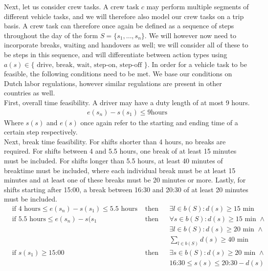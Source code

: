 \documentclass[]{article}
\begin{document}
Next, let us consider crew tasks. A crew task $c$ may perform multiple segments of different vehicle tasks, and we will therefore also model our crew tasks on a trip basis. A crew task can therefore once again be defined as a sequence of steps throughout the day of the form $S = \{ s_1, \dots, s_n \}$. We will however now need to incorporate breaks, waiting and handovers as well; we will consider all of these to be steps in this sequence, and will differentiate between action types using $a(s) \in \{\text{ drive, break, wait, step-on, step-off }\}$. In order for a vehicle task to be feasible, the following conditions need to be met. We base our conditions on Dutch labor regulations, however similar regulations are present in other countries as well. \\ 
First, overall time feasibility. A driver may have a duty length of at most 9 hours. \\
\begin{align}
  e(s_n) - s(s_1) \leq 9\text{hours}
\end{align}
Where $s(s)$ and $e(s)$ once again refer to the starting and ending time of a certain step respectively. \\
Next, break time feasibility. For shifts shorter than 4 hours, no breaks are required. For shifts between 4 and 5.5 hours, one break of at least 15 minutes must be included. For shifts longer than 5.5 hours, at least 40 minutes of breaktime must be included, where each individual break must be at least 15 minutes and at least one of these breaks must be 20 minutes or more. Lastly, for shifts starting after 15:00, a break between 16:30 and 20:30 of at least 20 minutes must be included. 
\begin{align}
  &\text{if } 4 \text{ hours} \leq e(s_n) - s(s_1) \leq 5.5 \text{ hours}&\text{ then} && \exists l \in b(S) : d(s) \geq 15 \text{ min} \\
  &\text{if } 5.5 \text{ hours} \leq e(s_n) - s(s_1 &\text{ then} && \forall s \in b(S) : d(s) \geq 15\text{ min } \land \\
  &&&& \exists l \in b(S) : d(s) \geq 20 \text{ min } \land \\
  &&&& \sum_{l \in b(S)}d(s) \geq 40 \text{ min} \\
  &\text{if } s(s_1) \geq \text{15:00} &\text{ then} && \exists s \in b(S) : d(s) \geq 20 \text{ min } \land \\
  &&&& \text{16:30} \leq s(s) \leq \text{20:30} - d(s)  \\
\end{align}
\end{document}
